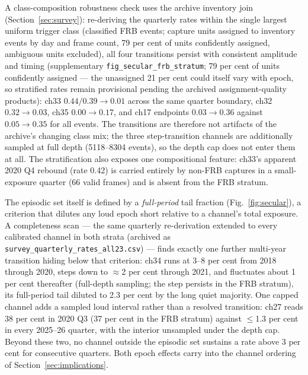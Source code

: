 A class-composition robustness check uses the archive inventory join
(Section~\ref{sec:survey}): re-deriving the quarterly rates within the
single largest uniform trigger class (classified FRB events;
capture units assigned to inventory events by day and frame count, 79
per cent of units confidently assigned, ambiguous units excluded), all
four transitions persist with consistent amplitude and timing
(supplementary \texttt{fig\_secular\_frb\_stratum}; 79 per cent of
units confidently assigned --- the unassigned 21 per cent could itself
vary with epoch, so stratified rates remain provisional pending the
archived assignment-quality products): ch33
$0.44/0.39 \rightarrow 0.01$ across the same quarter boundary, ch32
$0.32 \rightarrow 0.03$, ch35 $0.00 \rightarrow 0.17$, and ch17
endpoints $0.03 \rightarrow 0.36$ against $0.05 \rightarrow 0.35$ for
all events. The transitions are therefore not artifacts of the
archive's changing class mix; the three step-transition channels are
additionally sampled at full depth (5118--8304 events), so the depth
cap does not enter them at all. The stratification also exposes one
compositional feature: ch33's apparent 2020 Q4 rebound (rate 0.42) is
carried entirely by non-FRB captures in a small-exposure quarter (66
valid frames) and is absent from the FRB stratum. 

The episodic set itself is defined by a \emph{full-period} tail
fraction (Fig.~\ref{fig:secular}), a criterion that dilutes any loud
epoch short relative to a channel's total exposure. A completeness
scan --- the same quarterly re-derivation extended to every calibrated
channel in both strata (archived as
\texttt{survey\_quarterly\_rates\_all23.csv}) --- finds exactly one
further multi-year transition hiding below that criterion: ch34 runs
at 3--8 per cent from 2018 through 2020, steps down to $\approx$2 per
cent through 2021, and fluctuates about 1 per cent thereafter
(full-depth sampling; the step persists in the FRB stratum), its
full-period tail diluted to 2.3 per cent by the long quiet majority.
One capped channel adds a sampled loud interval rather than a resolved
transition: ch27 reads 38 per cent in 2020 Q3 (37 per cent in the FRB
stratum) against $\le$1.3 per cent in every 2025--26 quarter, with the
interior unsampled under the depth cap. Beyond these two, no channel
outside the episodic set sustains a rate above 3 per cent for
consecutive quarters. Both epoch effects carry into the channel
ordering of Section~\ref{sec:implications}.

